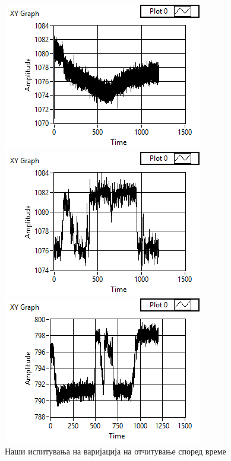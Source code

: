 \documentclass[12pt]{article}
\begin{document}
    \begin{figure}[H]
      \centering
      \begin{minipage}{0.45\linewidth}
        \centering
        \includegraphics[width = \textwidth]{./images/kinect_graph_1.png}
      \end{minipage}
      \begin{minipage}{0.45\linewidth}
          \centering
          \includegraphics[width = \textwidth]{./images/kinect_graph_2.png}
        \end{minipage}
      \includegraphics[width = 0.45\linewidth]{./images/kinect_graph_3.png}
      \caption{Наши испитувања на варијација на отчитување според време}
      \end{figure}
\end{document}
